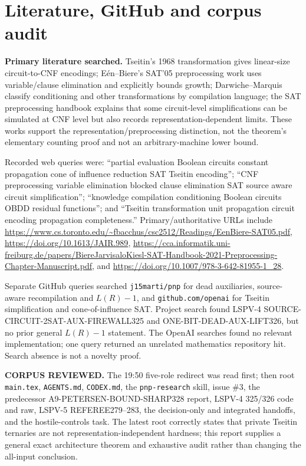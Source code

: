 \documentclass[11pt]{article}
\begin{document}
\section{Literature, GitHub and corpus audit}
\noindent\textbf{Primary literature searched.} Tseitin's 1968 transformation gives linear-size circuit-to-CNF encodings; E\'en--Biere's SAT'05 preprocessing work uses variable/clause elimination and explicitly bounds growth; Darwiche--Marquis classify conditioning and other transformations by compilation language; the SAT preprocessing handbook explains that some circuit-level simplifications can be simulated at CNF level but also records representation-dependent limits. These works support the representation/preprocessing distinction, not the theorem's elementary counting proof and not an arbitrary-machine lower bound.

Recorded web queries were: ``partial evaluation Boolean circuits constant propagation cone of influence reduction SAT Tseitin encoding''; ``CNF preprocessing variable elimination blocked clause elimination SAT source aware circuit simplification''; ``knowledge compilation conditioning Boolean circuits OBDD residual functions''; and ``Tseitin transformation unit propagation circuit encoding propagation completeness.'' Primary/authoritative URLs include
\url{https://www.cs.toronto.edu/~fbacchus/csc2512/Readings/EenBiere-SAT05.pdf},
\url{https://doi.org/10.1613/JAIR.989},
\url{https://cca.informatik.uni-freiburg.de/papers/BiereJarvisaloKiesl-SAT-Handbook-2021-Preprocessing-Chapter-Manuscript.pdf}, and
\url{https://doi.org/10.1007/978-3-642-81955-1_28}.

Separate GitHub queries searched \texttt{j15marti/pnp} for dead auxiliaries, source-aware recompilation and $L(R)-1$, and \texttt{github.com/openai} for Tseitin simplification and cone-of-influence SAT. Project search found LSPV-4 SOURCE-CIRCUIT-2SAT-AUX-FIREWALL325 and ONE-BIT-DEAD-AUX-LIFT326, but no prior general $L(R)-1$ statement. The OpenAI searches found no relevant implementation; one query returned an unrelated mathematics repository hit. Search absence is not a novelty proof.

\noindent\textbf{CORPUS REVIEWED.} The 19:50 five-role redirect was read first; then root \texttt{main.tex}, \texttt{AGENTS.md}, \texttt{CODEX.md}, the \texttt{pnp-research} skill, issue \#3, the predecessor A9-PETERSEN-BOUND-SHARP328 report, LSPV-4 325/326 code and raw, LSPV-5 REFEREE279--283, the decision-only and integrated handoffs, and the hostile-controls task. The latest root correctly states that private Tseitin ternaries are not representation-independent hardness; this report supplies a general exact architecture theorem and exhaustive audit rather than changing the all-input conclusion.
\end{document}
